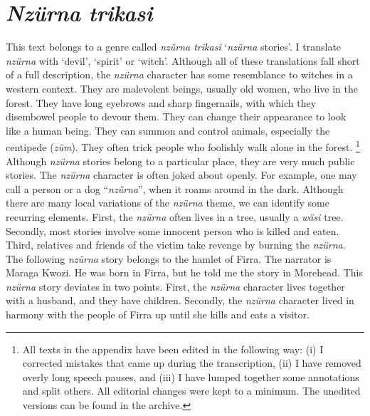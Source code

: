 
\appendix
{}

\section*{\emph{Nzürna trikasi}}\label{nzurna}

This text belongs to a genre called \emph{nzürna trikasi} `\emph{nzürna} stories'. I translate \emph{nzürna} with `devil', `spirit' or `witch'. Although all of these translations fall short of a full description, the \emph{nzürna} character has some resemblance to witches in a western context. They are malevolent beings, usually old women, who live in the forest. They have long eyebrows and sharp fingernails, with which they disembowel people to devour them. They can change their appearance to look like a human being. They can summon and control animals, especially the centipede (\emph{züm}). They often trick people who foolishly walk alone in the forest. \footnote{All texts in the appendix have been edited in the following way: (i) I corrected mistakes that came up during the transcription, (ii) I have removed overly long speech pauses, and (iii) I have lumped together some annotations and split others. All editorial changes were kept to a minimum. The unedited versions can be found in the archive.}\\

Although \emph{nzürna} stories belong to a particular place, they are very much public stories. The \emph{nzürna} character is often joked about openly. For example, one may call a person or a dog ``\emph{nzürna}'', when it roams around in the dark. Although there are many local variations of the \emph{nzürna} theme, we can identify some recurring elements. First, the \emph{nzürna} often lives in a tree, usually a \emph{wäsi} tree. Secondly, most stories involve some innocent person who is killed and eaten. Third, relatives and friends of the victim take revenge by burning the \emph{nzürna}.\\

The following \emph{nzürna} story belongs to the hamlet of Firra. The narrator is Maraga Kwozi. He was born in Firra, but he told me the story in Morehead. This \emph{nzürna} story deviates in two points. First, the \emph{nzürna} character lives together with a husband, and they have children. Secondly, the \emph{nzürna} character lived in harmony with the people of Firra up until she kills and eats a visitor.\\

